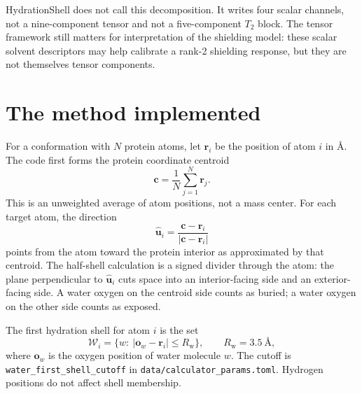\documentclass[11pt]{article}
\begin{document}
HydrationShell does not call this decomposition. It writes four scalar channels,
not a nine-component tensor and not a five-component \(T_2\) block. The tensor
framework still matters for interpretation of the shielding model: these
scalar solvent descriptors may help calibrate a rank-2 shielding response, but
they are not themselves tensor components.

\section{The method implemented}

For a conformation with \(N\) protein atoms, let \(\bm r_i\) be the position of
atom \(i\) in \(\si{\angstrom}\). The code first forms the protein coordinate
centroid
\begin{equation}
  \bm c = \frac{1}{N}\sum_{j=1}^{N}\bm r_j .
  \label{eq:centroid}
\end{equation}
This is an unweighted average of atom positions, not a mass center. For each
target atom, the direction
\begin{equation}
  \hat{\bm u}_i =
  \frac{\bm c-\bm r_i}{|\bm c-\bm r_i|}
  \label{eq:interior}
\end{equation}
points from the atom toward the protein interior as approximated by that
centroid. The half-shell calculation is a signed divider through the
atom: the plane perpendicular to \(\hat{\bm u}_i\) cuts space into an
interior-facing side and an exterior-facing side. A water oxygen on the centroid
side counts as buried; a water oxygen on the other side counts as exposed.

The first hydration shell for atom \(i\) is the set
\begin{equation}
  \mathcal W_i =
  \{w:\ |\bm o_w-\bm r_i|\le R_{\mathrm w}\},
  \qquad R_{\mathrm w}=\SI{3.5}{\angstrom},
  \label{eq:shell}
\end{equation}
where \(\bm o_w\) is the oxygen position of water molecule \(w\). The cutoff is
\texttt{water\_first\_shell\_cutoff} in \texttt{data/calculator\_params.toml}.
Hydrogen positions do not affect shell membership.
\end{document}
